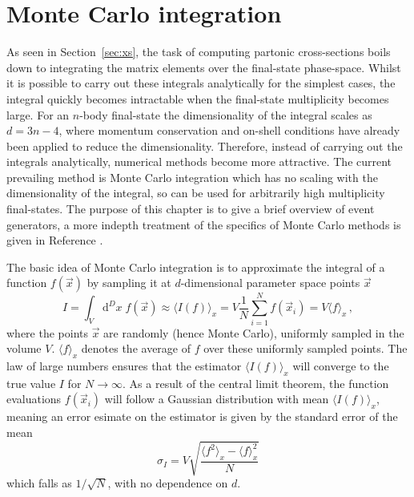 \documentclass[main.tex]{subfiles}
\begin{document}
    \section{Monte Carlo integration}\label{sec:MC_integration}
    As seen in Section~\ref{sec:xs}, the task of
    computing partonic cross-sections boils down
    to integrating the matrix elements over the
    final-state phase-space. Whilst it is possible to
    carry out these integrals analytically for the simplest
    cases, the integral quickly becomes intractable when the
    final-state multiplicity becomes large. For an $n$-body
    final-state the dimensionality of the integral scales as $d=3n-4$,
    where momentum conservation and on-shell conditions
    have already been applied to reduce the dimensionality.
    Therefore, instead of carrying out the integrals analytically,
    numerical methods become more attractive. The current
    prevailing method is Monte Carlo integration which
    has no scaling with the dimensionality of the integral,
    so can be used for arbitrarily high multiplicity final-states.
    The purpose of this chapter is to give a brief overview
    of event generators, a more indepth treatment of the
    specifics of Monte Carlo methods is given in Reference
    \cite{James:1980yn}.

    The basic idea of Monte Carlo integration is to approximate
    the integral of a function $f(\vec{x})$ by sampling it
    at $d$-dimensional parameter space points $\vec{x}$
    \begin{equation}\label{eqn:MC_integration}
        I = \int_{V} \mathrm{d}^{D}x \; f(\vec{x}) \approx \langle I(f) \rangle_{x} = V \dfrac{1}{N} \sum_{i=1}^{N} f(\vec{x}_{i}) = V \langle f \rangle_{x} \, ,
    \end{equation}
    where the points $\vec{x}$ are randomly (hence Monte Carlo),
    uniformly sampled in the volume $V$. $\langle f \rangle_{x}$
    denotes the average of $f$ over these uniformly sampled
    points. The law of large numbers ensures that the
    estimator $\langle I(f) \rangle_{x}$ will converge to
    the true value $I$ for $N \rightarrow \infty$. As a
    result of the central limit theorem, the function evaluations
    $f(\vec{x}_{i})$ will follow a Gaussian distribution with
    mean $\langle I(f) \rangle_{x}$,
    meaning an error esimate on the estimator is given by
    the standard error of the mean
    \begin{equation}\label{eqn:MC_error}
        \sigma_{I} = V \sqrt{\dfrac{\langle f^{2} \rangle_{x} - \langle f \rangle_{x}^{2}}{N}}
    \end{equation}
    which falls as $1/\sqrt{N}$, with no dependence
    on $d$.
\end{document}
